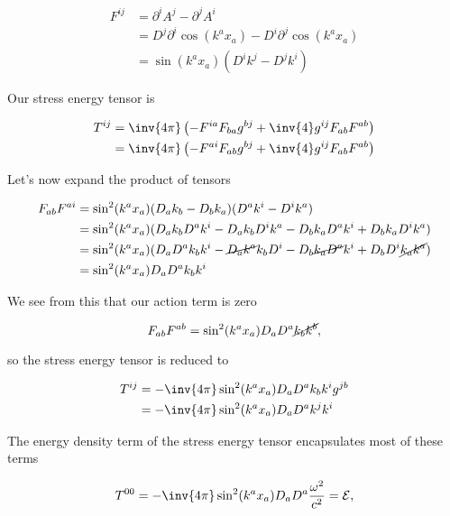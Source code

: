\begin{align*}
F^{ i j} 
&= \partial^i A^j - \partial^j A^i \\
&= 
D^j \partial^i \cos( k^a x_a ) 
-D^i \partial^j \cos( k^a x_a ) \\
&= 
\sin( k^a x_a ) ( D^i k^j - D^j k^i ) 
\end{align*}

Our stress energy tensor is 

\begin{align*}
T^{i j} 
&= \inv{4 \pi}
\left(
- F^{i a} F_{b a} g^{b j} + \inv{4} g^{i j} F_{ab} F^{ ab}
\right) \\
&= \inv{4 \pi}
\left(
- F^{a i} F_{a b} g^{b j} + \inv{4} g^{i j} F_{ab} F^{ ab}
\right)
\end{align*}

Let's now expand the product of tensors

\begin{align*}
F_{a b} F^{a i} 
&=
\sin^2( k^a x_a)
( D_a k_b - D_b k_a ) 
( D^a k^i - D^i k^a ) \\
&=
\sin^2( k^a x_a) (
D_a k_b D^a k^i 
-D_a k_b D^i k^a 
- D_b k_a D^a k^i 
+ D_b k_a D^i k^a ) \\
&=
\sin^2( k^a x_a) (
D_a D^a k_b k^i 
- \cancel{D_a k^a} k_b D^i 
- D_b \cancel{k_a D^a} k^i 
+ D_b D^i \cancel{k_a k^a} ) \\
&=
\sin^2( k^a x_a) D_a D^a k_b k^i 
\end{align*}

We see from this that our action term is zero

\begin{equation}\label{eqn:relElectroDynProblemSet6:150}
F_{a b} F^{a b} = \sin^2( k^a x_a) D_a D^a \cancel{k_b k^b},
\end{equation}

so the stress energy tensor is reduced to

\begin{align*}
T^{i j} 
&= -\inv{4 \pi} \sin^2( k^a x_a) D_a D^a k_b k^i g^{j b} \\
&= -\inv{4 \pi} \sin^2( k^a x_a) D_a D^a k^j k^i \\
\end{align*}

The energy density term of the stress energy tensor encapsulates most of these terms

\begin{equation}\label{eqn:relElectroDynProblemSet6:170}
T^{0 0} 
= -\inv{4 \pi} \sin^2( k^a x_a) D_a D^a \frac{\omega^2}{c^2} = \mathcal{E},
\end{equation}

